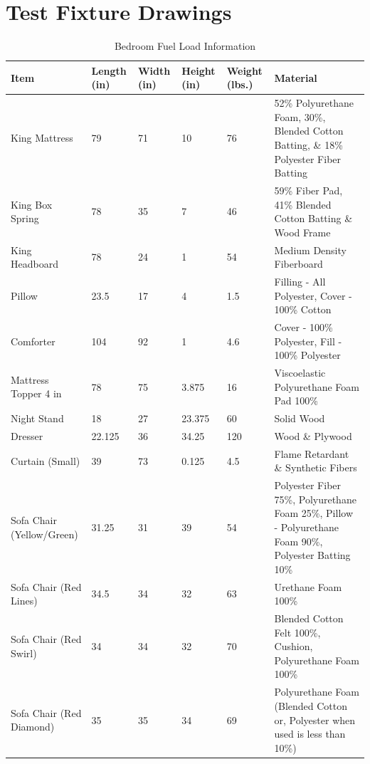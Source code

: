 \clearpage		\large
\chapter{Test Fixture Drawings} \label{App:test_figure_drawings}

\begin{table}[H]
\centering
\begin{tabular}{|L{0.23\textwidth}|C{0.08\textwidth}|C{0.08\textwidth}|C{0.08\textwidth}|C{0.08\textwidth}|L{0.25\textwidth}|}
\hline
Item 								&Length (in) 	&Width (in) 	&Height (in) 	&Weight (lbs.) 	&Material \\ \hline \hline
King Mattress 						&79 			&71 			&10 			&76 			&52\% Polyurethane Foam, 30\%, Blended Cotton Batting, \& 18\% Polyester Fiber Batting \\ \hline
King Box Spring 					&78 			&35 			&7 				&46 			&59\% Fiber Pad, 41\% Blended Cotton Batting \& Wood Frame \\ \hline
King Headboard 						&78 			&24 			&1 				&54 			&Medium Density Fiberboard \\ \hline
Pillow 								&23.5 			&17 			&4 				&1.5 			&Filling - All Polyester, Cover - 100\% Cotton \\ \hline
Comforter 							&104 			&92 			&1 				&4.6 			&Cover - 100\% Polyester, Fill - 100\% Polyester \\ \hline
Mattress Topper 4 in 				&78 			&75 			&3.875 			&16  			&Viscoelastic Polyurethane Foam Pad 100\% \\ \hline
Night Stand 						&18 			&27 			&23.375 		&60 			&Solid Wood \\ \hline
Dresser 							&22.125 		&36 			&34.25 			&120 			&Wood \& Plywood \\ \hline
Curtain (Small) 					&39 			&73 			&0.125 			&4.5 			&Flame Retardant \& Synthetic Fibers \\ \hline
Sofa Chair (Yellow/Green) 			&31.25 			&31 			&39 			&54 			&Polyester Fiber 75\%, Polyurethane Foam 25\%, Pillow - Polyurethane Foam 90\%, Polyester Batting 10\% \\ \hline
Sofa Chair (Red Lines) 				&34.5 			&34 			&32 			&63 			&Urethane Foam 100\% \\ \hline
Sofa Chair (Red Swirl) 				&34 			&34 			&32 			&70 			&Blended Cotton Felt 100\%, Cushion, Polyurethane Foam 100\% \\ \hline
Sofa Chair (Red Diamond) 			&35 			&35 			&34 			&69 			&Polyurethane Foam (Blended Cotton or, Polyester when used is less than 10\%) \\ \hline
\end{tabular}
\caption{Bedroom Fuel Load Information}
\label{table:bd_fuel_weights}
\end{table}

